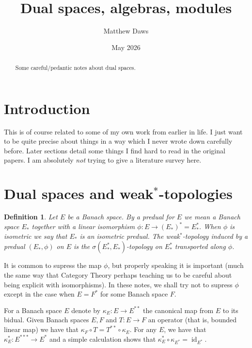 \documentclass[a4paper,11pt]{article}
\theoremstyle{plain}
\newtheorem{definition}[proposition]{Definition}
\theoremstyle{remark}
\newcommand{\id}{\operatorname{id}}
\begin{document}
\title{Dual spaces, algebras, modules}
\author{Matthew Daws}
\date{May 2026}
\maketitle

\begin{abstract}
Some careful/pedantic notes about dual spaces.
\end{abstract}

\section{Introduction}

This is of course related to some of my own work from earlier in life.  I just want to be quite precise about things in a way which I never wrote down carefully before.  Later sections detail some things I find hard to read in the original papers.  I am absolutely \emph{not} trying to give a literature survey here.




\section{Dual spaces and \texorpdfstring{weak$^*$}{weak star}-topologies}

\begin{definition}
Let $E$ be a Banach space.  By a \emph{predual} for $E$ we mean a Banach space $E_*$ together with a linear isomorphism $\phi \colon E \to (E_*)^* = E_*^*$.  When $\phi$ is isometric we say that $E_*$ is an \emph{isometric predual}.  The \emph{weak$^*$-topology} induced by a predual $(E_*, \phi)$ on $E$ is the $\sigma(E_*^*, E_*)$-topology on $E_*^*$ transported along $\phi$.
\end{definition}

It is common to supress the map $\phi$, but properly speaking it is important (much the same way that Category Theory perhaps teaching us to be careful about being explicit with isomorphisms).  In these notes, we shall try not to supress $\phi$ except in the case when $E = F^*$ for some Banach space $F$.

For a Banach space $E$ denote by $\kappa_E \colon E \to E^{**}$ the canonical map from $E$ to its bidual.  Given Banach spaces $E,F$ and $T\colon E\to F$ an operator (that is, bounded linear map) we have that $\kappa_F\circ T = T^{**} \circ \kappa_E$.  For any $E$, we have that $\kappa_E^* \colon E^{***} \to E^*$ and a simple calculation shows that $\kappa_E^* \circ \kappa_{E^*} = \id_{E^*}$.
\end{document}

